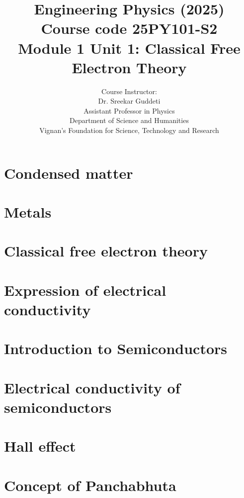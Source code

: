 \documentclass{beamer}
\title[Engineering Physics]{Engineering Physics (2025) \\ Course code
	25PY101-S2 \\ Module 1 Unit 1: Classical Free Electron Theory}
\author{Course Instructor:\\ 
	{\color{VignanBlue} Dr. Sreekar Guddeti}\\
	Assistant Professor in Physics\\
	Department of Science and Humanities \\
	{\color{VignanRed}Vignan's Foundation for Science, Technology and Research}
}
\newif\ifshowhidden
\begin{document}
	\frame{\titlepage}
	
	\section{Condensed matter}
	
	\section{Metals}
	
	\section{Classical free electron theory}
	
	\section{Expression of electrical conductivity}
	
	\section{Introduction to Semiconductors}
	
	\section{Electrical conductivity of semiconductors}
	
	\section{Hall effect}
	
	\section{Concept of Panchabhuta}
	
\end{document}
